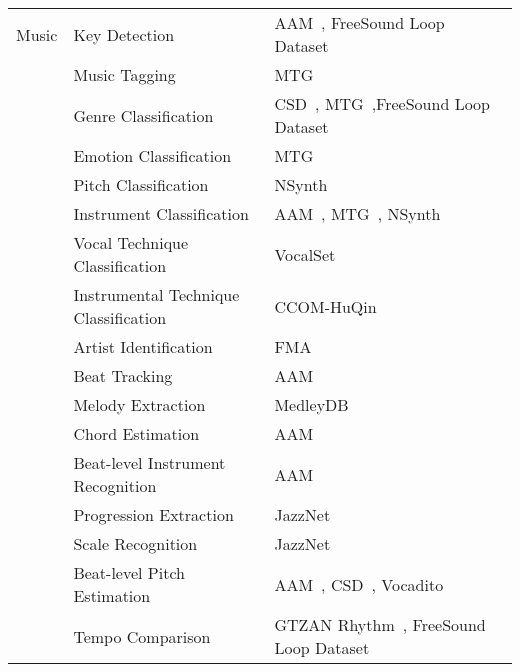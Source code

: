 \begin{longtable}{p{1cm}p{6cm}p{6cm}}
\midrule

Music & Key Detection & AAM~\citep{ostermann2023aam}, FreeSound Loop Dataset~\citep{ramires2020}\\
    \cline{2-3} %
    \multirow{29}{*}{} & Music Tagging & MTG~\citep{bogdanov2019mtg} \\
    \cline{2-3} %
    & Genre Classification & CSD~\citep{choi2020children}, MTG~\citep{bogdanov2019mtg},FreeSound Loop Dataset~\citep{ramires2020} \\
    \cline{2-3} %
    & Emotion Classification & MTG~\citep{bogdanov2019mtg} \\
    \cline{2-3} %
    & Pitch Classification & NSynth~\citep{engel2017neural} \\
    \cline{2-3} %
    & Instrument Classification & AAM~\citep{ostermann2023aam}, MTG~\citep{bogdanov2019mtg}, NSynth~\citep{engel2017neural} \\
    \cline{2-3} %
    & Vocal Technique Classification & VocalSet~\citep{wilkins2018vocalset} \\
    \cline{2-3} %
    & Instrumental Technique Classification & CCOM-HuQin~\citep{zhang2022ccom} \\
    \cline{2-3} %
    & Artist Identification & FMA~\citep{defferrard2016fma}\ \\
    \cline{2-3} %
    
    & Beat Tracking & AAM~\citep{ostermann2023aam} \\
    \cline{2-3} %
    & Melody Extraction & MedleyDB~\citep{bittner2014medleydb} \\
    \cline{2-3} %
    & Chord Estimation & AAM~\citep{ostermann2023aam} \\ \cline{2-3} 

    & Beat-level Instrument Recognition & AAM~\citep{ostermann2023aam} \\ \cline{2-3} %
    & Progression Extraction & JazzNet~\citep{adegbija2023jazznet}\\  \cline{2-3} %
    & Scale Recognition & JazzNet~\citep{adegbija2023jazznet}\\  \cline{2-3} %

    & Beat-level Pitch Estimation & AAM~\citep{ostermann2023aam}, CSD~\citep{choi2020children}, Vocadito~\citep{bittner2021vocadito} \\  \cline{2-3} %

    & Tempo Comparison & GTZAN Rhythm~\citep{marchand2015gtzan}, FreeSound Loop Dataset~\citep{ramires2020} \\  \cline{2-3} %


\end{longtable}
